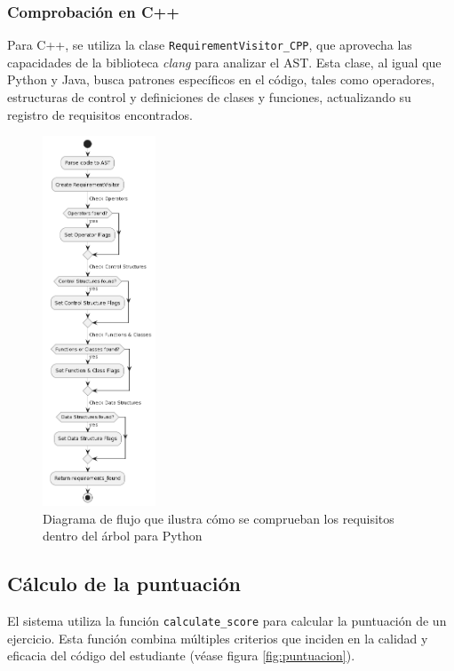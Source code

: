\subsubsection*{Comprobación en C++}

Para C++, se utiliza la clase \texttt{RequirementVisitor\_CPP}, que aprovecha las capacidades de la biblioteca \textit{clang} para analizar el AST. Esta clase, al igual que Python y Java, busca patrones específicos en el código, tales como operadores, estructuras de control y definiciones de clases y funciones, actualizando su registro de requisitos encontrados.

\begin{figure}[H]
    \centering
    \includegraphics[width=0.3\textwidth]{imagenes/comprobacionescodigo.png}
    \caption{Diagrama de flujo que ilustra cómo se comprueban los requisitos dentro del árbol para Python}
    \label{fig:arbolrequisios}
\end{figure}


\subsection{Cálculo de la puntuación}

El sistema utiliza la función \texttt{calculate\_score} para calcular la puntuación de un ejercicio. Esta función combina múltiples criterios que inciden en la calidad y eficacia del código del estudiante (véase figura \ref{fig:puntuacion}).

